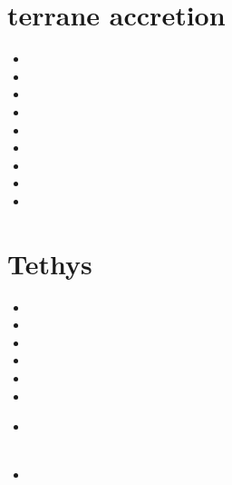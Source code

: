 \section{terrane accretion} 

\begin{small}
\begin{itemize}
\item[2012] 
\item[2014] 
\item[2015] 
\item[2016] 
\item[2018] 
\item[2020] 
\item[2021] 
\item[2022] 
\item[2025] 
\end{itemize}
\end{small}

\section{Tethys} 

\begin{small}
\begin{itemize}
\item[\nineteenninetynine] 
\item[\twothousand] 
\item[\twothousandeleven] 
\item[\twothousandthirteen]
\item[\twothousandsixteen] 
\item[\twothousandeighteen] 
\item[\twothousandtwentytwo] 
 \\
 \\
\item[\twothousandtwentythree]
\end{itemize}
\end{small}




